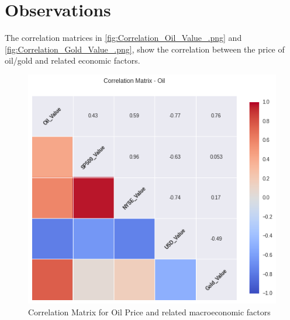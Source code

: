 \documentclass[runningheads]{llncs}
\begin{document}
\newpage

\section{Observations}

\noindent The correlation matrices in \autoref{fig:Correlation_Oil_Value_.png} and \autoref{fig:Correlation_Gold_Value_.png}, show the correlation between the price of oil/gold and related economic factors. \\

\begin{figure}
\centering
\includegraphics[width=\textwidth]{Correlation_Oil_Value_.png}
\caption{Correlation Matrix for Oil Price and related macroeconomic factors}
\label{fig:Correlation_Oil_Value_.png}
\end{figure}
\end{document}
